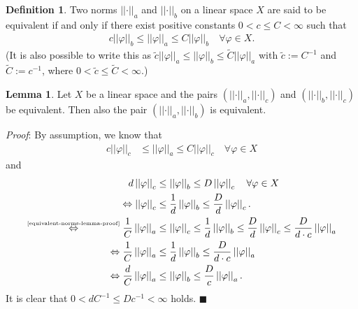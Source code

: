 \documentclass[12pt, a4paper]{article}
\numberwithin{equation}{section}
\theoremstyle{definition}
\theoremstyle{definition}
\newtheorem{defn}[thm]{Definition} %
\newtheorem{lemma}[thm]{Lemma} %
\newcommand{\norm}[2]{\left\vert\left\vert #1 \right\vert\right\vert_{#2}}
\begin{document}
	\begin{defn}
		Two norms $\left\vert\left\vert \cdot \right\vert\right\vert_{a}$ and $\left\vert\left\vert \cdot \right\vert\right\vert_{b}$ on a linear space $X$ are said to be equivalent if and only if there exist positive constants $0 < c \leq C < \infty$ such that 
		\begin{align}\label{equivalence_norms}
			c\norm{\varphi}{b} \leq \norm{\varphi}{a} \leq C\norm{\varphi}{b} \quad \forall \varphi \in X. 
		\end{align}	
		(It is also possible to write this as $\tilde{c}\norm{\varphi}{a} \leq \norm{\varphi}{b} \leq \tilde{C}\norm{\varphi}{a}$ with $\tilde{c} := C^{-1}$ and $\tilde{C} := c^{-1}$, where $0 < \tilde{c} \leq \tilde{C}<\infty$.)
	\end{defn}

	\begin{lemma}
		Let $X$ be a linear space and the pairs $\left(\norm{\cdot}{a}, \norm{\cdot}{c}\right)$ and $\left(\norm{\cdot}{b}, \norm{\cdot}{c}\right)$ be equivalent. Then also the pair $\left(\norm{\cdot}{a}, \norm{\cdot}{b}\right)$ is equivalent. 
	\end{lemma}
	\noindent\textit{Proof}: By assumption, we know that 
	\begin{align}
		c\norm{\varphi}{c} &\leq \norm{\varphi}{a} \leq C\norm{\varphi}{c} \quad \forall \varphi\in X \label{equivalent-norms-lemma-proof}
	\end{align}
	and 
	\begin{align}
		d\norm{\varphi}{c} &\leq \norm{\varphi}{b} \leq D\norm{\varphi}{c} \quad \forall \varphi\in X
							\\ 
		\Leftrightarrow \norm{\varphi}{c} &\leq \frac{1}{d}\norm{\varphi}{b} \leq \frac{D}{d}\norm{\varphi}{c}. 
							\\
		\overset{\tiny\eqref{equivalent-norms-lemma-proof}}{\Leftrightarrow} \frac{1}{C}\norm{\varphi}{a} &\leq \norm{\varphi}{c} \leq \frac{1}{d}\norm{\varphi}{b} \leq \frac{D}{d}\norm{\varphi}{c} \leq \frac{D}{d\cdot c}\norm{\varphi}{a}  
							\\ 
		\Leftrightarrow \frac{1}{C}\norm{\varphi}{a} &\leq \frac{1}{d}\norm{\varphi}{b} \leq \frac{D}{d\cdot c}\norm{\varphi}{a}
							\\ 
		\Leftrightarrow \frac{d}{C}\norm{\varphi}{a} &\leq \norm{\varphi}{b} \leq \frac{D}{c}\norm{\varphi}{a}. 
	\end{align}
	It is clear that $0 < dC^{-1} \leq Dc^{-1} < \infty$ holds. \qquad\qquad\qquad\qquad\qquad\qquad\qquad\qquad\qquad\qquad\qquad\quad$\blacksquare$
\end{document}
